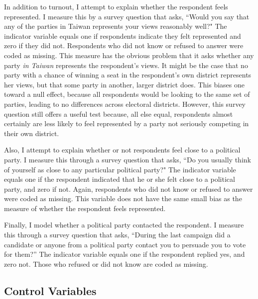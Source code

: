 \documentclass[12pt]{article}
\begin{document}
In addition to turnout, I attempt to explain whether the respondent feels represented. I measure this by a survey question that asks, ``Would you say that any of the parties in Taiwan represents your views reasonably well?" The indicator variable equals one if respondents indicate they felt represented and zero if they did not. Respondents who did not know or refused to answer were coded as missing. This measure has the obvious problem that it asks whether any party \textit{in Taiwan} represents the respondent's views. It might be the case that no party with a chance of winning a seat in the respondent's own district represents her views, but that some party in another, larger district does. This biases one toward a null effect, because all respondents would be looking to the same set of parties, leading to no differences across electoral districts. However, this survey question still offers a useful test because, all else equal, respondents almost certainly are less likely to feel represented by a party not seriously competing in their own district.

Also, I attempt to explain whether or not respondents feel close to a political party. I measure this through a survey question that asks, ``Do you usually think of yourself as close to any particular political party?" The indicator variable equals one if the respondent indicated that he or she felt close to a political party, and zero if not. Again, respondents who did not know or refused to answer were coded as missing. This variable does not have the same small bias as the measure of whether the respondent feels represented.

Finally, I model whether a political party contacted the respondent. I measure this through a survey question that asks, ``During the last campaign did a candidate or anyone from a political party contact you to persuade you to vote for them?'' The indicator variable equals one if the respondent replied yes, and zero not. Those who refused or did not know are coded as missing.

\subsection*{Control Variables}
\end{document}
